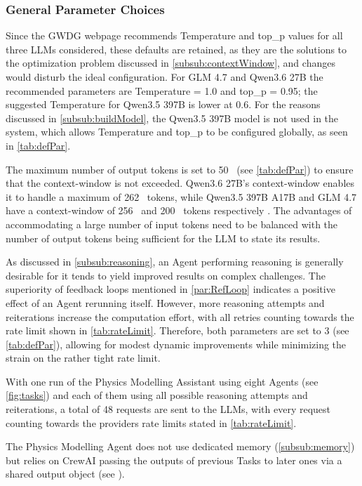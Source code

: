 \documentclass[
	fontsize = 11pt,
	paper = a4,
	draft = false,
	twoside = true,
	titlepage = false
]{scrartcl}
\numberwithin{equation}{subsection}
\begin{document}
	\subsubsection{General Parameter Choices} \label{subsub:paramCh}
	Since the GWDG webpage recommends Temperature and top\_p values for all three \gls{LLM}s considered, these defaults are retained, as they are the solutions to the optimization problem discussed in \autoref{subsub:contextWindow}, and changes would disturb the ideal configuration. For GLM 4.7 and Qwen3.6 27B the recommended parameters are Temperature = 1.0 and top\_p = 0.95; the suggested Temperature for Qwen3.5 397B is lower at 0.6. For the reasons discussed in \autoref{subsub:buildModel}, the Qwen3.5 397B model is not used in the system, which allows Temperature and top\_p to be configured globally, as seen in \autoref{tab:defPar}.
	
	The maximum number of output \glspl{token} is set to \si{50 \kilo} (see \autoref{tab:defPar}) to ensure that the \gls{context-window} is not exceeded. Qwen3.6 27B's \gls{context-window} enables it to handle a maximum of \si{262\kilo} \glspl{token}, while Qwen3.5 397B A17B and GLM 4.7 have a \gls{context-window} of \si{256\kilo} and \si{200\kilo} \glspl{token} respectively \autocite{saiaModDetail}. The advantages of accommodating a large number of input \glspl{token} need to be balanced with the number of output \glspl{token} being sufficient for the \gls{LLM} to state its results.
	
	As discussed in \autoref{subsub:reasoning}, an \gls{Agent} performing reasoning is generally desirable for it tends to yield improved results on complex challenges. The superiority of feedback loops mentioned in \autoref{par:RefLoop} indicates a positive effect of an \gls{Agent} rerunning itself. However, more reasoning attempts and reiterations increase the computation effort, with all retries counting towards the rate limit shown in \autoref{tab:rateLimit}. Therefore, both parameters are set to 3 (see \autoref{tab:defPar}), allowing for modest dynamic improvements while minimizing the strain on the rather tight rate limit.
	
	With one run of the Physics Modelling Assistant using eight \glspl{Agent} (see \autoref{fig:tasks}) and each of them using all possible reasoning attempts and reiterations, a total of 48 requests are sent to the \gls{LLM}s, with every request counting towards the providers rate limits stated in \autoref{tab:rateLimit}.
	
	The Physics Modelling Agent does not use dedicated memory (\autoref{subsub:memory}) but relies on CrewAI passing the outputs of previous Tasks to later ones via a shared output object (see \autocite[line 1610]{crewPy}).
	
\end{document}
